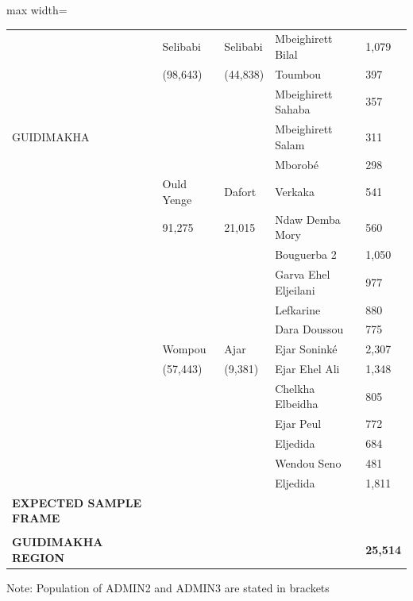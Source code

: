 \begin{table}[!ht]
\begin{adjustbox}{max width=\textwidth}
\begin{tabular}{lllll}
		~ & Selibabi & Selibabi & Mbeighirett Bilal &  1,079  \\ 
		~ & (98,643) & (44,838) & Toumbou &  397  \\ 
		~ & ~ & ~ & Mbeighirett Sahaba &  357  \\ 
		GUIDIMAKHA & ~ & ~ & Mbeighirett Salam &  311  \\ 
		~ & ~ & ~ & Mborobé &  298  \\ 
		~ & Ould Yenge & Dafort & Verkaka &  541  \\
		~ & 91,275 & 21,015 & Ndaw Demba Mory &  560  \\ 
		~ & ~ & ~ & Bouguerba 2 &  1,050  \\ 
		~ & ~ & ~ & Garva Ehel Eljeilani &  977  \\ 
		~ & ~ & ~ & Lefkarine &  880  \\ 
		~ & ~ & ~ & Dara Doussou &  775  \\ 
		~ & Wompou & Ajar & Ejar Soninké &  2,307  \\
		~ & (57,443) & (9,381) & Ejar Ehel Ali &  1,348  \\ 
		~ & ~ & ~ & Chelkha Elbeidha &  805  \\ 
		~ & ~ & ~ & Ejar Peul &  772  \\ 
		~ & ~ & ~ & Eljedida &  684  \\ 
		~ & ~ & ~ & Wendou Seno &  481  \\ 
		~ & ~ & ~ & Eljedida &  1,811  \\  \hline
		\textbf{EXPECTED SAMPLE FRAME} \\ \\ \textbf{GUIDIMAKHA REGION} & ~ & ~ & ~ &  \textbf{25,514} \\ \hline \hline
		\end{tabular}
	\end{adjustbox}
	\begin{tablenotes}
		\item Note: Population of ADMIN2 and ADMIN3 are stated in brackets
	\end{tablenotes}
\end{table}